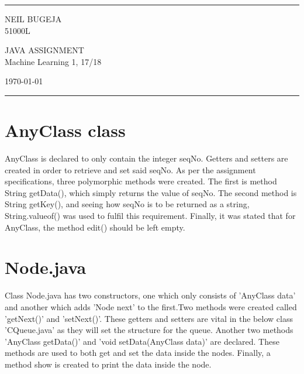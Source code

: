 \documentclass[a4paper]{article}
\begin{document}
\graphicspath{{home/Neil/Computing and business/Year 1/Semester 1/Java-CIS1100/Documentation/Images}}


\fancyhead[C]{}
\hrule \medskip %
\begin{minipage}{0.295\textwidth} 
\raggedright
\footnotesize
NEIL BUGEJA\hfill\\   
51000L\hfill\\
\end{minipage}
\begin{minipage}{0.4\textwidth} 
\centering 
\large 
JAVA ASSIGNMENT\\ 
\normalsize 
Machine Learning 1, 17/18\\ 
\end{minipage}
\begin{minipage}{0.295\textwidth} 
\raggedleft
\today\hfill\\
\end{minipage}
\medskip\hrule 
\bigskip

\section{AnyClass class}
AnyClass is declared to only contain the integer seqNo. Getters and setters are created in order to retrieve and set said seqNo. As per the assignment specifications, three polymorphic methods were created. The first is method String getData(), which simply returns the value of seqNo. The second method is String getKey(), and seeing how seqNo is to be returned as a string, String.valueof() was used to fulfil this requirement. Finally, it was stated that for AnyClass, the method edit() should be left empty.
\bigskip

\section{Node.java}
Class Node.java has two constructors, one which only consists of 'AnyClass data' and another which adds 'Node next' to the first.Two methods were created called 'getNext()' and 'setNext()'. These getters and setters are vital in the below class 'CQueue.java' as they will set the structure for the queue. Another two methods 'AnyClass getData()' and 'void setData(AnyClass data)' are declared. These methods are used to both get and set the data inside the nodes. Finally, a method show is created to print the data inside the node.
\bigskip
\end{document}
